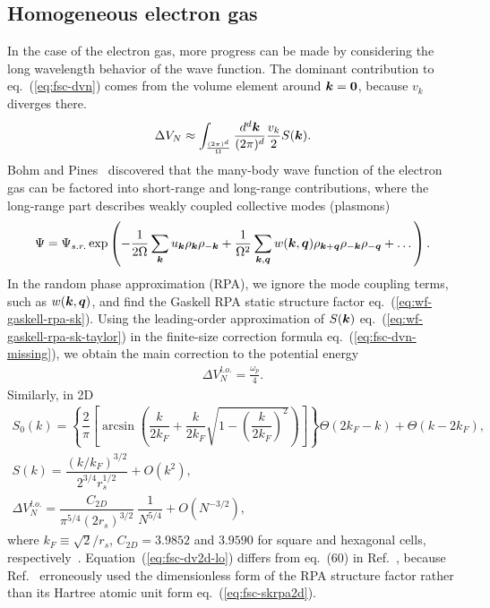 \subsection{Homogeneous electron gas}
In the case of the electron gas, more progress can be made by considering the long wavelength behavior of the wave function. The dominant contribution to eq.~(\ref{eq:fsc-dvn}) comes from the volume element around $\boldsymbol{k}=\boldsymbol{0}$, because $v_k$ diverges there.
\begin{align} \label{eq:fsc-dvn-missing}
\Delta V_N \approx \int_{\frac{(2\pi)^d}{\Omega}} \dfrac{d^d\boldsymbol{k}}{(2\pi)^d} \frac{v_k}{2}S(\boldsymbol{k}).
\end{align}
Bohm and Pines~\cite{Bohm1953} discovered that the many-body wave function of the electron gas can be factored into short-range and long-range contributions, where the long-range part describes weakly coupled collective modes (plasmons)~\cite{Chiesa2007,Holzmann2016}
\begin{align} \label{eq:fsc-rpa-wf}
\Psi = \Psi_{s.r.} \exp\left(
-\frac{1}{2\Omega} \sum\limits_{\boldsymbol{k}} u_{\boldsymbol{k}} \rho_{\boldsymbol{k}} \rho_{-\boldsymbol{k}} + \frac{1}{\Omega^2}\sum\limits_{\boldsymbol{k},\boldsymbol{q}} w(\boldsymbol{k}, \boldsymbol{q}) \rho_{\boldsymbol{k}+\boldsymbol{q}}\rho_{-\boldsymbol{k}}\rho_{-\boldsymbol{q}}+\dots
\right).
\end{align}
In the random phase approximation (RPA), we ignore the mode coupling terms, such as $w(\boldsymbol{k},\boldsymbol{q})$, and find the Gaskell RPA static structure factor eq.~(\ref{eq:wf-gaskell-rpa-sk}).
Using the leading-order approximation of $S(\boldsymbol{k})$ eq.~(\ref{eq:wf-gaskell-rpa-sk-taylor}) in the finite-size correction formula eq.~(\ref{eq:fsc-dvn-missing}), we obtain the main correction to the potential energy
\begin{align}
\Delta V_N^{l.o.} = \frac{\omega_p}{4}.
\end{align}
Similarly, in 2D~\cite{Gori-Giorgi2004}
\begin{align}
S_0(k) = \left\{
\dfrac{2}{\pi}\left[
\arcsin\left(\dfrac{k}{2k_F}+\dfrac{k}{2k_F}\sqrt{1-\left(\dfrac{k}{2k_F}\right)^2}\right)
\right]\right\} \Theta(2k_F-k) + \Theta(k-2k_F), \\
S(k) = \dfrac{(k/k_F)^{3/2}}{2^{3/4}r_s^{1/2}} + O(k^2), \label{eq:fsc-skrpa2d}\\
\Delta V_N^{l.o.} = \dfrac{C_{2D}}{\pi^{5/4} (2r_s)^{3/2}}~\dfrac{1}{N^{5/4}} + O(N^{-3/2}), \label{eq:fsc-dv2d-lo}
\end{align}
where $k_F\equiv\sqrt{2}/r_s$, $C_{2D}=3.9852$ and $3.9590$ for square and hexagonal cells, respectively~\cite{Drummond2008}. Equation~(\ref{eq:fsc-dv2d-lo}) differs from eq.~(60) in Ref.~\cite{Drummond2008}, because Ref.~\cite{Drummond2008} erroneously used the dimensionless form of the RPA structure factor rather than its Hartree atomic unit form eq.~(\ref{eq:fsc-skrpa2d}).

